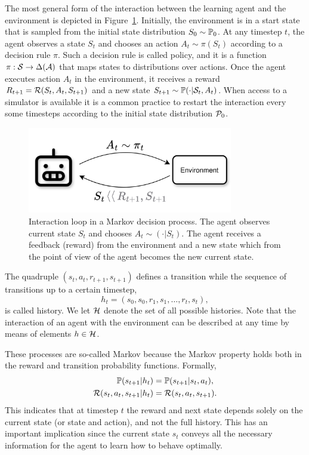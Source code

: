 The most general form of the interaction between the learning agent and the environment is depicted in Figure~\ref{fig:rl_loop}. Initially, the environment is in a start state that is sampled from the initial state distribution $S_0\sim\mathbb{P}_0$. At any timestep $t$, the agent observes a state $S_t$ and chooses an action $A_t\sim\pi(S_t)$ according to a decision rule $\pi$. Such a decision rule is called policy, and it is a function 
$\pi:\mathcal{S}\rightarrow\Delta(\mathcal{A})$ that maps states to distributions over actions. Once the agent executes action $A_t$ in the environment, it receives a reward $R_{t+1} = \mathcal{R}(S_t, A_t, S_{t+1})$ and a new state $S_{t+1}\sim\mathbb{P}(\cdot\lvert\mathcal{S}_t, A_t)$. When access to a simulator is available it is a common practice to restart the interaction every some timesteps according to the initial state distribution $\mathcal{P}_0$. 
\begin{figure}
  \centering
  \includegraphics[width=0.8\textwidth]{figures/background/RL_loop.png}
  \caption{Interaction loop in a Markov decision process. The agent observes current state $S_t$ and chooses $A_t\sim(\cdot\lvert S_t)$. The agent receives a feedback (reward) from the environment and a new state which from the point of view of the agent becomes the new current state. }
  \label{fig:rl_loop}
\end{figure}


The quadruple $(s_t, a_t, r_{t+1}, s_{t+1})$ defines a transition while the sequence of transitions up to a certain timestep, \begin{equation*}
  h_t = (s_0, s_0, r_1, s_1,\dots,r_t,s_t),
\end{equation*}
is called history. We let $\mathcal{H}$ denote the set of all possible histories. Note that the interaction of an agent with the environment can be described at any time by means of elements $h\in\mathcal{H}$.

These processes are so-called Markov because the Markov property holds both in the reward and transition probability functions. Formally,
\begin{align*}
  \mathbb{P}(s_{t+1}\lvert h_t) &= \mathbb{P}(s_{t+1}\lvert s_t, a_t), \\
  \mathcal{R}(s_t, a_t, s_{t+1}\lvert h_t) &=  \mathcal{R}(s_t, a_t, s_{t+1}).
\end{align*}
This indicates that at timestep $t$ the reward and next state depends solely on the current state (or state and action), and not the full history. This has an important implication since the current state $s_t$ conveys all the necessary information for the agent to learn how to behave optimally.

